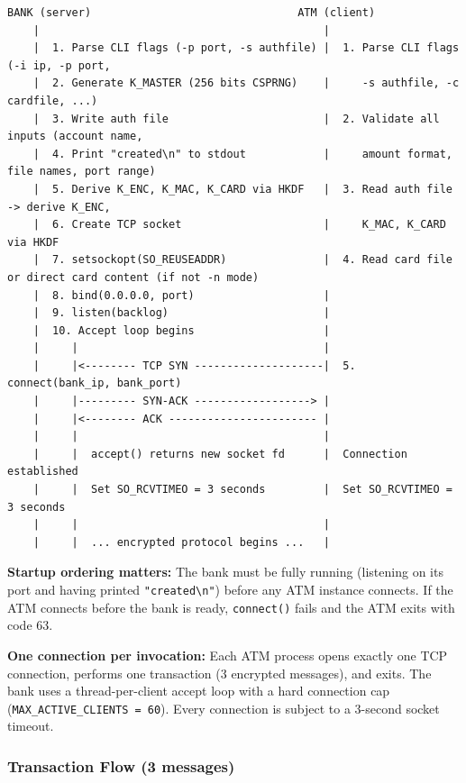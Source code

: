\documentclass[
]{article}
\begin{document}
\begin{verbatim}
BANK (server)                                ATM (client)
    |                                            |
    |  1. Parse CLI flags (-p port, -s authfile) |  1. Parse CLI flags (-i ip, -p port,
    |  2. Generate K_MASTER (256 bits CSPRNG)    |     -s authfile, -c cardfile, ...)
    |  3. Write auth file                        |  2. Validate all inputs (account name,
    |  4. Print "created\n" to stdout            |     amount format, file names, port range)
    |  5. Derive K_ENC, K_MAC, K_CARD via HKDF   |  3. Read auth file -> derive K_ENC,
    |  6. Create TCP socket                      |     K_MAC, K_CARD via HKDF
    |  7. setsockopt(SO_REUSEADDR)               |  4. Read card file or direct card content (if not -n mode)
    |  8. bind(0.0.0.0, port)                    |
    |  9. listen(backlog)                        |
    |  10. Accept loop begins                    |
    |     |                                      |
    |     |<-------- TCP SYN --------------------|  5. connect(bank_ip, bank_port)
    |     |--------- SYN-ACK ------------------> |
    |     |<-------- ACK ----------------------- |
    |     |                                      |
    |     |  accept() returns new socket fd      |  Connection established
    |     |  Set SO_RCVTIMEO = 3 seconds         |  Set SO_RCVTIMEO = 3 seconds
    |     |                                      |
    |     |  ... encrypted protocol begins ...   |
\end{verbatim}

\textbf{Startup ordering matters:} The bank must be fully running
(listening on its port and having printed
\texttt{"created\textbackslash{}n"}) before any ATM instance connects.
If the ATM connects before the bank is ready, \texttt{connect()} fails
and the ATM exits with code 63.

\textbf{One connection per invocation:} Each ATM process opens exactly
one TCP connection, performs one transaction (3 encrypted messages), and
exits. The bank uses a thread-per-client accept loop with a hard
connection cap (\texttt{MAX\_ACTIVE\_CLIENTS = 60}). Every connection is
subject to a 3-second socket timeout.

\newpage
\hypertarget{transaction-flow-3-messages}{%
\subsubsection{Transaction Flow (3
messages)}\label{transaction-flow-3-messages}}
\end{document}
